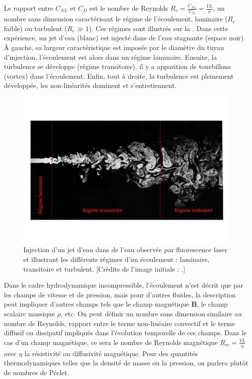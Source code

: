  Le rapport entre $C_{NL}$ et $C_D$ est le nombre de Reynolds $R_e = \frac{C_{NL}}{C_D} = \frac{VL}{\nu}$, un nombre sans dimension caractérisant le régime de l'écoulement, laminaire ($R_e$ faible) ou turbulent ($R_e \gg 1$). Ces régimes sont illustrés sur la . Dans cette expérience, un jet d'eau (blanc) est injecté dans de l'eau stagnante (espace noir). À gauche, sa largeur caractéristique est imposée par le diamètre du tuyau d'injection, l'écoulement est alors dans un régime laminaire. Ensuite, la turbulence se développe (régime transitoire), il y a apparition de tourbillons (vortex) dans l'écoulement. Enfin, tout à droite, la turbulence est pleinement développée, les non-linéarités dominent et s'entretiennent.
 \begin{figure}[!ht]
  \centering
 \includegraphics[width=\linewidth,trim=1cm 3cm 1cm 3cm, clip=true]{./Mainmatter/Part_0/images/turbul_Re}
 \caption{Injection d'un jet d'eau dans de l'eau observée par fluorescence laser et illustrant les différents régimes d'un écoulement : laminaire, transitoire et turbulent. [Crédits de l'image initiale : \cite{van_dyke_album_1982}.]}
 \label{fig:ecoulement}
 \end{figure}
 
 Dans le cadre hydrodynamique incompressible, l'écoulement n'est décrit que par les champs de vitesse et de pression, mais pour d'autres fluides, la description peut impliquer d'autres champs tels que le champ magnétique $\boldsymbol{B}$, le champ scalaire massique $\rho$, etc. On peut définir un nombre sans dimension similaire au nombre de Reynolds, rapport entre le terme non-linéaire convectif et le terme diffusif ou dissipatif impliqués dans l'évolution temporelle de ces champs. Dans le cas d'un champ magnétique, ce sera le nombre de Reynolds magnétique $R_m = \frac{VL}{\eta}$ avec $\eta$ la résistivité ou diffusivité magnétique. Pour des quantités thermodynamiques telles que la densité de masse ou la pression, on parlera plutôt de nombres de Péclet.
 
